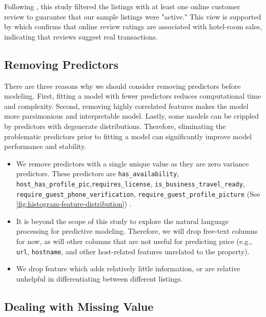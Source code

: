 Following \textcite{wang2017price}, this study filtered the listings with at
least one online customer review to guarantee that our sample listings were
"active." This view is supported by \textcite{ye2009impact}  which confirms that online
review ratings are associated with hotel-room sales, indicating that reviews
suggest real transactions.

\subsection{Removing Predictors}

There are three reasons why we should consider removing predictors before
modeling. First, fitting a model with fewer predictors reduces computational
time and complexity. Second, removing highly correlated features makes the model
more parsimonious and interpretable model.  Lastly, some models can be crippled
by predictors with degenerate distributions.  Therefore, eliminating the
problematic predictors prior to fitting a model can significantly improve model
performance and stability.
\begin{itemize}

    \item We remove  predictors with a single unique value as they are  zero
        variance predictors. These predictors are \texttt{has\_availability},
        \texttt{host\_has\_profile\_pic},\texttt{requires\_license},
        \texttt{is\_business\_travel\_ready},
        \texttt{require\_guest\_phone\_verification},\newline
        \texttt{require\_guest\_profile\_picture} (See
        \ref{fig:histogram-feature-distribution}) .
    \item It is beyond the scope of this study to explore the natural language
        processing for predictive modeling.  Therefore,  we will drop free-text
        columns for now, as will other columns that are not useful for
        predicting price (e.g., \texttt{url}, \texttt{hostname}, and other host-related features
        unrelated to the property).

    \item We drop feature which  adds relatively little information, or are
        relative unhelpful in differentiating between different listings.

\end{itemize}

\subsection{Dealing with Missing Value}

